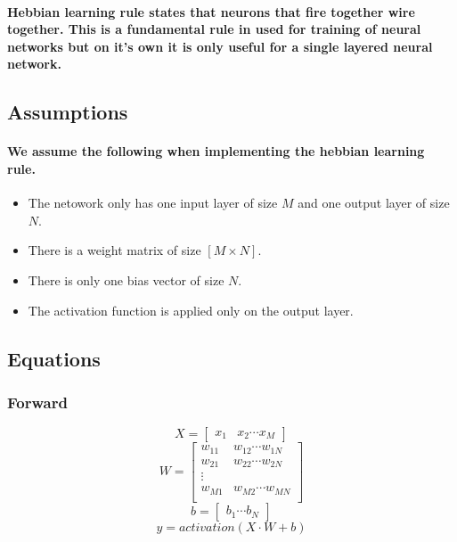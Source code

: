 \documentclass[../main.tex]{subfiles}
\begin{document}
\paragraph{Hebbian learning rule states that neurons that fire together wire together. This is a fundamental rule in used for training of neural networks but on it's own it is only useful for a single layered neural network.}
\subsection{Assumptions}
\paragraph{We assume the following when implementing the hebbian learning rule.}
\begin{itemize}
  \item The netowork only has one input layer of size $M$ and one output layer of size $N$.
  \item There is a weight matrix of size $[M \times N]$.
  \item There is only one bias vector of size $N$.
  \item The activation function is applied only on the output layer.
\end{itemize}
\subsection{Equations}
\subsubsection{Forward}
$$ X = \begin{bmatrix}
  x_1 & x_2 \cdots x_M
\end{bmatrix}$$
  $$ W = \begin{bmatrix}
  w_{11} & w_{12} \cdots w_{1N} \\
  w_{21} & w_22 \cdots w_{2N} \\
   \vdots & \\
  w_{M1} & w_{M2} \cdots w_{MN}\\
\end{bmatrix}$$
$$ b = \begin{bmatrix}
  b_1
  \cdots
  b_N
\end{bmatrix}$$
$$ y = activation(X \cdot W + b)$$
 \\
\end{document}
